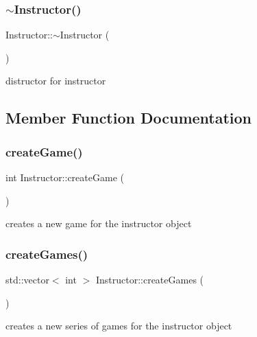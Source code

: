 \subsubsection{\texorpdfstring{$\sim$\+Instructor()}{~Instructor()}}
{\footnotesize\ttfamily Instructor\+::$\sim$\+Instructor (\begin{DoxyParamCaption}{ }\end{DoxyParamCaption})}



distructor for instructor 



\subsection{Member Function Documentation}
\mbox{\label{class_instructor_a9fca4b1272f062d14ffb5bb89b10b6f8}} 
\subsubsection{\texorpdfstring{create\+Game()}{createGame()}}
{\footnotesize\ttfamily int Instructor\+::create\+Game (\begin{DoxyParamCaption}{ }\end{DoxyParamCaption})\hspace{0.3cm}{\ttfamily [private]}}



creates a new game for the instructor object 

\mbox{\label{class_instructor_a8d3fa7d2c4cb8268d43db1bb8ecc56f9}} 
\subsubsection{\texorpdfstring{create\+Games()}{createGames()}}
{\footnotesize\ttfamily std\+::vector$<$ int $>$ Instructor\+::create\+Games (\begin{DoxyParamCaption}{ }\end{DoxyParamCaption})\hspace{0.3cm}{\ttfamily [private]}}



creates a new series of games for the instructor object 

